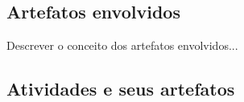   
  \subsection{Artefatos envolvidos}
  
    Descrever o conceito dos artefatos envolvidos...
    
  \subsection{Atividades e seus artefatos}
    
    
    
    \pagebreak
    
    
    \pagebreak
    

    
    